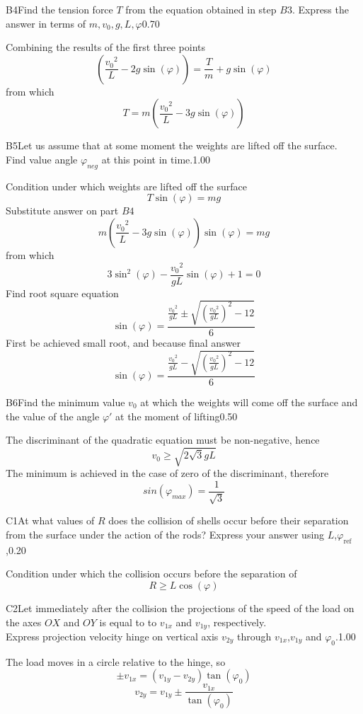 \documentclass[11pt,a4paper]{article}
\begin{document}
\begin{solcard}{B4}{Find the tension force $T$ from the equation obtained in step $B3$. Express the answer in terms of $m,{v_0},g,L,{\varphi}$}{0.70}

Combining the results of the first three points $$\left(\frac{{v_0}^2}{L}-2g\sin(\varphi)\right)=\frac{T}{m}+g\sin(\varphi) $$ from which $$T=m\left(\frac{{v_0}^2}{L}-3g\sin(\varphi)\right) $$

\end{solcard}

\begin{solcard}{B5}{Let us assume that at some moment the weights are lifted off the surface. $$ $$ Find value angle $\varphi_{neg}$ at this point in time.}{1.00}

Condition under which weights are lifted off the surface $$T\sin(\varphi)=mg $$ Substitute answer on part $B4$ $$m\left(\frac{{v_0}^2}{L}-3g\sin(\varphi)\right)\sin(\varphi)=mg $$ from which $$3\sin^2(\varphi)-\frac{{v_0}^2}{gL}\sin(\varphi)+1=0 $$ Find root square equation $$\sin(\varphi)=\frac{\frac{{v_0}^2}{gL}\pm\sqrt{\left(\frac{{v_0}^2}{gL}\right)^2-12}}{6} $$ First be achieved small root, and because final answer $$\sin(\varphi)=\frac{\frac{{v_0}^2}{gL}-\sqrt{\left(\frac{{v_0}^2}{gL}\right)^2-12}}{6} $$

\end{solcard}

\begin{solcard}{B6}{Find the minimum value $v_0$ at which the weights will come off the surface and the value of the angle $\varphi' $ at the moment of lifting}{0.50}

The discriminant of the quadratic equation must be non-negative, hence $$v_0\geq{\sqrt{2\sqrt{3}gL}} $$ The minimum is achieved in the case of zero of the discriminant, therefore $$sin(\varphi_{max})=\frac{1}{\sqrt{3}} $$

\end{solcard}

\begin{solcard}{C1}{At what values of $R$ does the collision of shells occur before their separation from the surface under the action of the rods? Express your answer using $L$,$\varphi_\text{ref}$,}{0.20}

Condition under which the collision occurs before the separation of $$R\geq{L}\cos(\varphi) $$

\end{solcard}

\begin{solcard}{C2}{Let immediately after the collision the projections of the speed of the load on the axes $OX$ and $OY$ is equal to to $v_{1x}$ and $v_{1y}$, respectively. $$ $$ Express projection velocity hinge on vertical axis $v_{2y}$ through $v_{1x}$,$v_{1y}$ and ${\varphi_0}$.}{1.00}

The load moves in a circle relative to the hinge, so $$\pm{v_{1x}}=(v_{1y}-v_{2y})\tan(\varphi_0) $$ $$v_{2y}=v_{1y}\pm{\frac{v_{1x}}{\tan(\varphi_0)}} $$

\end{solcard}
\end{document}

